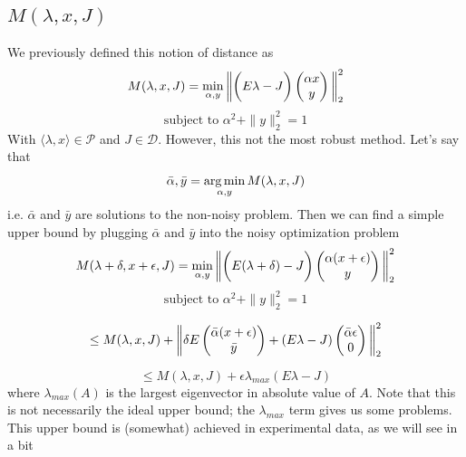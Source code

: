 \subsection{$M(\lambda, x, J)$}
We previously defined this notion of distance as
\begin{equation}
M(\lambda, x, J) = \min_{\alpha, y} \bigg{ \| } \bigg{(}E {\lambda} - J\bigg{)}
\begin{pmatrix}
\alpha x \\
y
\end{pmatrix}
     \bigg{ \| }_2^2
\end{equation}
$$ \text{subject to } \alpha^2 + \|y\|_2^2 = 1$$
 With 
$\langle \lambda,x \rangle \in \mathcal{P}$ and $J \in \mathcal{D}$.
However, this not the most robust method. Let's say that $$\bar{\alpha}, \bar{y} = \operatorname*{arg\,min}_{\alpha,y} M(\lambda, x, J)$$ i.e. $\bar{\alpha}$ and $\bar{y}$ are solutions to the non-noisy problem. 
 Then we can find a simple upper bound by plugging $\bar{\alpha}$ and $\bar{y}$ into the noisy optimization problem
\begin{equation}
M(\lambda + \delta, x + \epsilon, J) = \min_{\alpha, y} \bigg{ \| } \bigg{(}E (\lambda + \delta) - J\bigg{)}
\begin{pmatrix}
\alpha (x + \epsilon) \\
y
\end{pmatrix}
     \bigg{ \| }_2^2
\end{equation}
$$ \text{subject to } \alpha^2 + \|y\|_2^2 = 1$$


$$\leq 
M(\lambda, x, J) + 
\bigg{\|} \delta E \begin{pmatrix}
\bar{\alpha} (x + \epsilon) \\
\bar{y}
\end{pmatrix} + (E {\lambda} - J )
\begin{pmatrix}
\bar{\alpha} \epsilon \\
0
\end{pmatrix}
\bigg{\|}_2^2
$$

$$ \leq M(\lambda, x, J) + \epsilon\lambda_{max}(E {\lambda} - J)$$ 
where $\lambda_{max}(A)$ is the largest eigenvector in absolute value of $A$. Note that this is not necessarily the ideal upper bound; the $\lambda_{max}$ term gives us some problems. This upper bound is (somewhat) achieved in experimental data, as we will see in a bit



